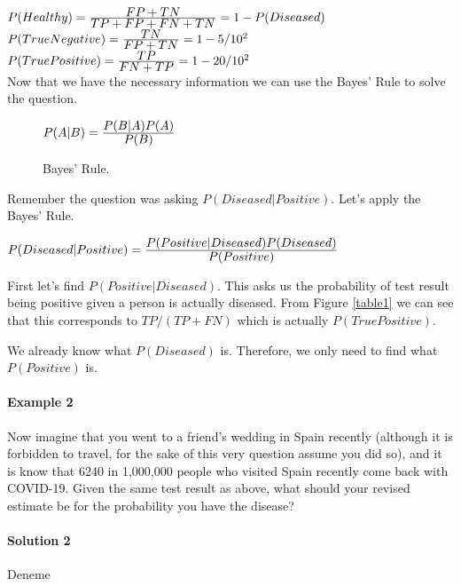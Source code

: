 \documentclass[12pt]{article}
\begin{document}
\(P(Healthy) = \frac{\displaystyle FP + TN}{\displaystyle TP + FP + FN + TN} = 1 - P(Diseased)\) \\

\(P(True Negative) = \frac{\displaystyle TN}{\displaystyle FP + TN} = 1 - 5/10^{2}\) \\

\(P(True Positive) = \frac{\displaystyle TP}{\displaystyle FN + TP} = 1 - 20/10^{2}\) \\

Now that we have the necessary information we can use the Bayes' Rule to solve the question.

\begin{figure}[h]
    \centering
        $ P(A|B)=\frac{\displaystyle P(B|A)P(A)}{\displaystyle P(B)}$
    \caption{Bayes' Rule.}
    \label{bayesrule}
\end{figure}

Remember the question was asking $P(Diseased|Positive)$. Let's apply the Bayes' Rule. 

\begin{center}
    $ P(Diseased|Positive)=\frac{\displaystyle P(Positive|Diseased)P(Diseased)}{\displaystyle P(Positive)}$
\end{center}

First let's find $P(Positive|Diseased)$. 
This asks us the probability of test result being positive 
given a person is actually diseased. 
From Figure \ref{table1} we can see that this corresponds to $TP /(TP + FN)$ which is actually $P(True Positive)$.

We already know what $P(Diseased)$ is. Therefore, we only need to find what $P(Positive)$ is.
\paragraph{Example 2}
Now imagine that you went to a friend’s wedding in Spain recently (although it is forbidden to travel, for the sake of this very question assume you did so), and it is know that 6240 in 1,000,000 people who visited Spain recently come back with COVID-19. Given the same test result as above, what should your revised estimate be for the probability you have the disease?

\paragraph{Solution 2}
Deneme
\end{document}
